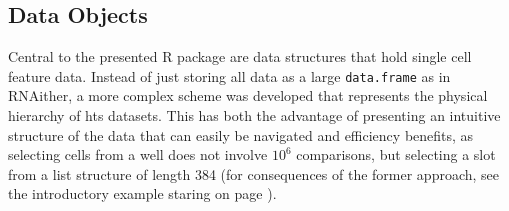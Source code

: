 \subsection{Data Objects}
Central to the presented R package are data structures that hold single cell feature data. Instead of just storing all data as a large \texttt{data.frame} as in RNAither, a more complex scheme was developed that represents the physical hierarchy of \gls{hts} datasets. This has both the advantage of presenting an intuitive structure of the data that can easily be navigated and efficiency benefits, as selecting cells from a well does not involve $10^6$ comparisons, but selecting a slot from a list structure of length 384 (for consequences of the former approach, see the introductory example staring on page \pageref{} ).

